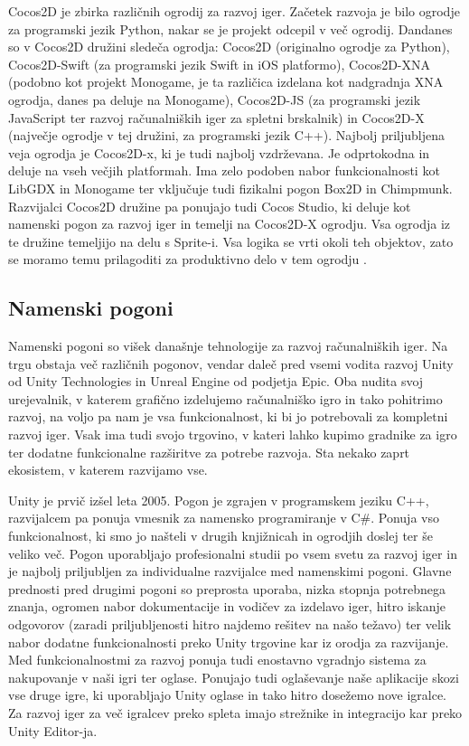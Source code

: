 \documentclass[12pt,a4paper,twoside]{book}
\begin{document}
Cocos2D je zbirka različnih ogrodij za razvoj iger. Začetek razvoja je bilo ogrodje za programski jezik Python, nakar se je projekt odcepil v več ogrodij. Dandanes so v Cocos2D družini sledeča ogrodja: Cocos2D (originalno ogrodje za Python), Cocos2D-Swift (za programski jezik Swift in iOS platformo), Cocos2D-XNA (podobno kot projekt Monogame, je ta različica izdelana kot nadgradnja XNA ogrodja, danes pa deluje na Monogame), Cocos2D-JS (za programski jezik JavaScript ter razvoj računalniških iger za spletni brskalnik) in Cocos2D-X (največje ogrodje v tej družini, za programski jezik C++). Najbolj priljubljena veja ogrodja je Cocos2D-x, ki je tudi najbolj vzdrževana. Je odprtokodna in deluje na vseh večjih platformah. Ima zelo podoben nabor funkcionalnosti kot LibGDX in Monogame ter vključuje tudi fizikalni pogon Box2D in Chimpmunk. Razvijalci Cocos2D družine pa ponujajo tudi Cocos Studio, ki deluje kot namenski pogon za razvoj iger in temelji na Cocos2D-X ogrodju. Vsa ogrodja iz te družine temeljijo na delu s Sprite-i. Vsa logika se vrti okoli teh objektov, zato se moramo temu prilagoditi za produktivno delo v tem ogrodju \cite{cocos2d}\cite{cocos2dx}.

\subsection{Namenski pogoni}
Namenski pogoni so višek današnje tehnologije za razvoj računalniških iger. Na trgu obstaja več različnih pogonov, vendar daleč pred vsemi vodita razvoj Unity od Unity Technologies in Unreal Engine od podjetja Epic. Oba nudita svoj urejevalnik, v katerem grafično izdelujemo računalniško igro in tako pohitrimo razvoj, na voljo pa nam je vsa funkcionalnost, ki bi jo potrebovali za kompletni razvoj iger. Vsak ima tudi svojo trgovino, v kateri lahko kupimo gradnike za igro ter dodatne funkcionalne razširitve za potrebe razvoja. Sta nekako zaprt ekosistem, v katerem razvijamo vse.

Unity je prvič izšel leta 2005. Pogon je zgrajen v programskem jeziku C++, razvijalcem pa ponuja vmesnik za namensko programiranje v C\#. Ponuja vso funkcionalnost, ki smo jo našteli v drugih knjižnicah in ogrodjih doslej ter še veliko več. Pogon uporabljajo profesionalni studii po vsem svetu za razvoj iger in je najbolj priljubljen za individualne razvijalce med namenskimi pogoni. Glavne prednosti pred drugimi pogoni so preprosta uporaba, nizka stopnja potrebnega znanja, ogromen nabor dokumentacije in vodičev za izdelavo iger, hitro iskanje odgovorov (zaradi priljubljenosti hitro najdemo rešitev na našo težavo) ter velik nabor dodatne funkcionalnosti preko Unity trgovine kar iz orodja za razvijanje. Med funkcionalnostmi za razvoj ponuja tudi enostavno vgradnjo sistema za nakupovanje v naši igri ter oglase. Ponujajo tudi oglaševanje naše aplikacije skozi vse druge igre, ki uporabljajo Unity oglase in tako hitro dosežemo nove igralce. Za razvoj iger za več igralcev preko spleta imajo strežnike in integracijo kar preko Unity Editor-ja.
\end{document}
